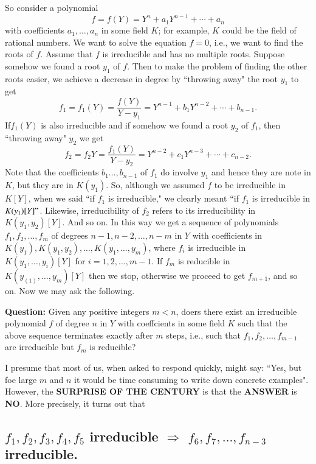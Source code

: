 So consider a polynomial
$$
f=f(Y) = Y^{n}+a_{1}Y^{n-1}+\cdots+a_{n}
$$
with coefficients $a_{1}, \ldots,a_{n}$ in some field $K$; for example, $K$ could be the field of rational numbers. We want to solve the equation $f=0$, i.e., we want to find the roots of $f$. Assume that $f$ is irreducible and has no multiple roots. Suppose somehow we found a root $y_{1} $ of $f$. Then to make the problem of finding the other roots easier, we achieve a decrease in degree by ``throwing away" the root $y_{1}$ to get
$$
f_{1}=f_{1}(Y)=\dfrac{f(Y)}{Y-y_{1}}=Y^{n-1}+b_{1}Y^{n-2}+\cdots+b_{n-1}.
$$
If\pageoriginale $f_{1}(Y)$ is also irreducible and if somehow we found a root $y_{2}$ of $f_{1}$, then  ``throwing away" $y_{2}$ we get
$$
f_{2} = f_{2}Y = \dfrac{f_{1}(Y)}{Y-y_{2}}=Y^{n-2}+c_{1}Y^{n-3}+\cdots+c_{n-2}.
$$
Note that the coefficients $b_{1}\ldots, b_{n-1}$ of $f_{1}$ do involve $y_{1}$ and hence they are note in $K$, but they are in $K(y_{1})$. So, although we assumed $f$ to be irreducible in $K[Y]$, when we said ``if  $f_{1}$ is irreducible," we clearly meant ``if $f_{1}$ is irreducible in $K(y_{1})[Y]"$. Likewise, irreducibility of $f_{2}$ refers to its irreducibility in $K(y_{1}, y_{2})[Y]$. And so on. In this way we get a sequence of polynomials $f_{1}, f_{2}, \ldots, f_{m}$ of degrees $n-1, n-2, \ldots, n-m$ in $Y$ with coefficients in $K(y_1), K(y_{1}, y_{2}), \ldots, K(y_{1},\ldots,y_{m})$, where $f_{i}$ is irreducible in $K(y_{1}, \ldots, y_{i})[Y]$ for $i=1, 2, \ldots, m-1$. If $f_{m}$ is reducible in $K(y_(1), \ldots, y_{m})[Y]$ then we stop, otherwise we proceed to get $f_{m+1}$, and so on. Now we may ask the following. 

\medskip
\noindent
{\bf Question:} Given any positive integers $m<n$, doers there exist an irreducible polynomial $f$ of degree $n$ in $Y$ with coeffcients in some field $K$ such that the above sequence terminates exactly after $m$ steps, i.e., such that  $f_{1}, f_{2}, \ldots, f_{m-1}$ are irreducible but $f_{m}$ is reducible?  

I presume that most of us, when asked to respond quickly, might say: ``Yes, but foe large $m$ and $n$ it would be time consuming to write down concrete examples". However, the {\bf SURPRISE OF THE CENTURY}  is that the {\bf ANSWER} is {\bf NO}. More precisely, it turns out that

\subsection{$f_{1}, f_{2}, f_{3}, f_{4}, f_{5}$ irreducible $\Rightarrow$
 $f_{6}, f_{7},\ldots, f_{n-3}$ irreducible.}\label{chap1-sec2.1}

